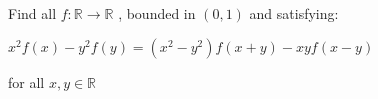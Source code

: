 Find all $f : \mathbb{R}\to \mathbb{R}$ , bounded in $(0,1)$ and satisfying:

$x^2 f(x) - y^2 f(y) = (x^2-y^2) f(x+y) -xy f(x-y)$

for all $x,y \in \mathbb{R}$

